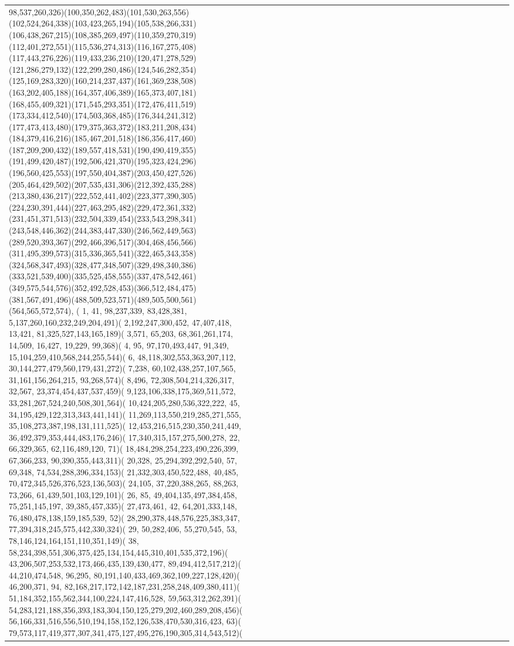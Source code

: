 \documentclass[varwidth=\maxdimen,border=10]{standalone}
\begin{document}
\begin{tabular}{@{}l@{}l@{}l@{}l@{}l@{}l@{}l@{}l@{}l@{}l@{}l@{}l@{}l@{}l@{}l@{}l@{}l@{}l@{}l@{}l@{}l@{}l@{}l@{}l@{}l@{}l@{}l@{}l@{}l@{}l@{}l@{}l@{}}
98,537,260,326)(100,350,262,483)(101,530,263,556)(102,524,264,338)(103,423,265,194)(105,538,266,331)(106,438,267,215)(108,385,269,497)(110,359,270,319)(112,401,272,551)(115,536,274,313)(116,167,275,408)(117,443,276,226)(119,433,236,210)(120,471,278,529)(121,286,279,132)(122,299,280,486)(124,546,282,354)(125,169,283,320)(160,214,237,437)(161,369,238,508)(163,202,405,188)(164,357,406,389)(165,373,407,181)(168,455,409,321)(171,545,293,351)(172,476,411,519)(173,334,412,540)(174,503,368,485)(176,344,241,312)(177,473,413,480)(179,375,363,372)(183,211,208,434)(184,379,416,216)(185,467,201,518)(186,356,417,460)(187,209,200,432)(189,557,418,531)(190,490,419,355)(191,499,420,487)(192,506,421,370)(195,323,424,296)(196,560,425,553)(197,550,404,387)(203,450,427,526)(205,464,429,502)(207,535,431,306)(212,392,435,288)(213,380,436,217)(222,552,441,402)(223,377,390,305)(224,230,391,444)(227,463,295,482)(229,472,361,332)(231,451,371,513)(232,504,339,454)(233,543,298,341)(243,548,446,362)(244,383,447,330)(246,562,449,563)(289,520,393,367)(292,466,396,517)(304,468,456,566)(311,495,399,573)(315,336,365,541)(322,465,343,358)(324,568,347,493)(328,477,348,507)(329,498,340,386)(333,521,539,400)(335,525,458,555)(337,478,542,461)(349,575,544,576)(352,492,528,453)(366,512,484,475)(381,567,491,496)(488,509,523,571)(489,505,500,561)(564,565,572,574), (  1, 41, 98,237,339, 83,428,381,  5,137,260,160,232,249,204,491)(  2,192,247,300,452, 47,407,418, 13,421, 81,325,527,143,165,189)(  3,571, 65,203, 68,361,261,174, 14,509, 16,427, 19,229, 99,368)(  4, 95, 97,170,493,447, 91,349, 15,104,259,410,568,244,255,544)(  6, 48,118,302,553,363,207,112, 30,144,277,479,560,179,431,272)(  7,238, 60,102,438,257,107,565, 31,161,156,264,215, 93,268,574)(  8,496, 72,308,504,214,326,317, 32,567, 23,374,454,437,537,459)(  9,123,106,338,175,369,511,572, 33,281,267,524,240,508,301,564)( 10,424,205,280,536,322,222, 45, 34,195,429,122,313,343,441,141)( 11,269,113,550,219,285,271,555, 35,108,273,387,198,131,111,525)( 12,453,216,515,230,350,241,449, 36,492,379,353,444,483,176,246)( 17,340,315,157,275,500,278, 22, 66,329,365, 62,116,489,120, 71)( 18,484,298,254,223,490,226,399, 67,366,233, 90,390,355,443,311)( 20,328, 25,294,392,292,540, 57, 69,348, 74,534,288,396,334,153)( 21,332,303,450,522,488, 40,485, 70,472,345,526,376,523,136,503)( 24,105, 37,220,388,265, 88,263, 73,266, 61,439,501,103,129,101)( 26, 85, 49,404,135,497,384,458, 75,251,145,197, 39,385,457,335)( 27,473,461, 42, 64,201,333,148, 76,480,478,138,159,185,539, 52)( 28,290,378,448,576,225,383,347, 77,394,318,245,575,442,330,324)( 29, 50,282,406, 55,270,545, 53, 78,146,124,164,151,110,351,149)( 38, 58,234,398,551,306,375,425,134,154,445,310,401,535,372,196)( 43,206,507,253,532,173,466,435,139,430,477, 89,494,412,517,212)( 44,210,474,548, 96,295, 80,191,140,433,469,362,109,227,128,420)( 46,200,371, 94, 82,168,217,172,142,187,231,258,248,409,380,411)( 51,184,352,155,562,344,100,224,147,416,528, 59,563,312,262,391)( 54,283,121,188,356,393,183,304,150,125,279,202,460,289,208,456)( 56,166,331,516,556,510,194,158,152,126,538,470,530,316,423, 63)( 79,573,117,419,377,307,341,475,127,495,276,190,305,314,543,512)( 
\end{tabular}
\end{document}
